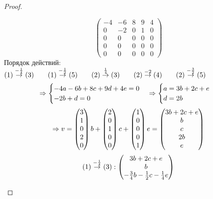 \documentclass[11pt, fleqn]{article}
\begin{document}
\begin{proof}
\begin{enumerate}
\[\begin{pmatrix}
      -4 & -6 & 8 & 9 & 4\\
      0 & -2 & 0 & 1 & 0\\
      0 & 0 & 0 & 0 & 0\\
      0 & 0 & 0 & 0 & 0\\
      0 & 0 & 0 & 0 & 0
    \end{pmatrix}\]
    Порядок действий:\\
    $(1) \overset{-\frac{1}{4}}{\rightarrow} (3) \qquad (1) \overset{-\frac{1}{2}}{\rightarrow} (5) \qquad (2) \overset{\frac{1}{4}}{\rightarrow} (3) \qquad (2) \overset{-2}{\rightarrow} (4) \qquad (2) \overset{-\frac{3}{2}}{\rightarrow} (5)$
    \[\Rightarrow \begin{cases}
      -4a - 6b + 8c + 9d + 4e = 0\\
      -2b + d = 0
    \end{cases} \Rightarrow \begin{cases}
      a = 3b + 2c + e\\
      d = 2b
    \end{cases}\]
    \[\Rightarrow v = \begin{pmatrix}
      3\\
      1\\
      0\\
      2\\
      0\\
    \end{pmatrix}b + \begin{pmatrix}
      2\\
      0\\
      1\\
      0\\
      0
    \end{pmatrix} c + \begin{pmatrix}
      1\\
      0\\
      0\\
      0\\
      1
    \end{pmatrix}e = \begin{pmatrix}
      3b + 2c + e\\
      b\\
      c\\
      2b\\
      e
    \end{pmatrix}\]
    \[(1) \overset{-\frac{1}{4}}{\rightarrow} (3): \begin{pmatrix}
      3b + 2c + e\\
      b\\
      -\frac{3}{4}b - \frac{1}{2}c - \frac{1}{4}e\\

\end{pmatrix}\]
\end{enumerate}
\end{proof}
\end{document}

